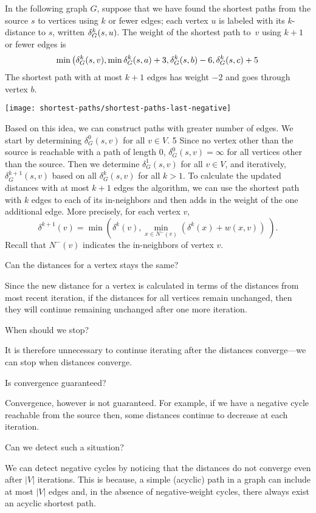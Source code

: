 \begin{example}
  In the following graph $G$, suppose that we have found the shortest
  paths from the source $s$ to vertices using $k$ or fewer edges; each
  vertex $u$ is labeled with its $k$-distance to $s$, written
  $\delta_G^k(s,u)$. The weight of the
  shortest path to~$v$ using $k+1$ or fewer edges is 
%
\[
\min
\left(
\delta_G^k(s,v),\min{\delta_G^k(s,a)+3, \delta_G^k(s,b)-6,\delta_G^k(s,c)+5}
\right
.
\]
%
The shortest path with at most $k+1$ edges has weight $-2$ and goes
through vertex $b$.

\begin{center}
\texttt{[image: shortest-paths/shortest-paths-last-negative]}
\end{center}
\label{ex:shortestpath::allbutone-negative}
\end{example}

Based on this idea, we can construct paths with greater number of
edges.  We start by determining $\delta^0_G(s,v)$ for all $v \in V$.
5
Since no vertex other than the source is reachable with a path of
length $0$, $\delta^0_G(s,v) = \infty$ for all vertices other than the
source.  
%
Then we determine $\delta^1_G(s,v)$ for all $v \in V$, and
iteratively, $\delta^{k+1}_G(s,v)$ based on all $\delta^{k}_G(s,v)$
for all $k > 1$.
%
To calculate the updated distances with at most $k+1$ edges the
algorithm, we can use the shortest path with $k$ edges to each of its
in-neighbors and then adds in the weight of the one additional edge.
More precisely, for each vertex $v$,
\[
\delta^{k+1}(v) = \min(\delta^{k}(v),\min_{x \in N^-(v)}
(\delta^{k}(x) + w(x,v))\;).
\]
Recall that $N^-(v)$ indicates the in-neighbors of vertex $v$.

\begin{question}
Can the distances for a vertex stays the same? 
\end{question}
Since the new distance for a vertex is calculated in terms of the
distances from most recent iteration, if the distances for all
vertices remain unchanged, then they will continue remaining unchanged
after one more iteration.  
%
\begin{question}
When should we stop? 
\end{question}
%
It is therefore unnecessary to continue iterating after the distances
converge---we can stop when distances converge.
%
\begin{question}
Is convergence guaranteed?  
\end{question}
Convergence, however is not guaranteed.  For example, if we have a
negative cycle reachable from the source then, some distances
continue to decrease at each iteration.
%
\begin{question}
Can we detect such a situation? 
\end{question}
%
We can detect negative cycles by noticing that the distances do not
converge even after $|V|$ iterations.  This is because, a simple
(acyclic) path in a graph can include at most $|V|$ edges and, in the
absence of negative-weight cycles, there always exist an acyclic
shortest path.



